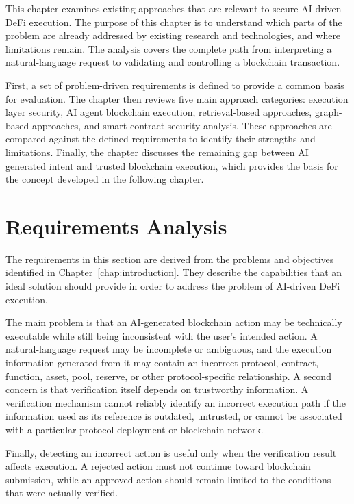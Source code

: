 This chapter examines existing approaches that are relevant to secure AI-driven DeFi execution. The purpose of this chapter is to understand which parts of the problem are already addressed by existing research and technologies, and where limitations remain. The analysis covers the complete path from interpreting a natural-language request to validating and controlling a blockchain transaction.

First, a set of problem-driven requirements is defined to provide a common basis for evaluation. The chapter then reviews five main approach categories: execution layer security, AI agent blockchain execution, retrieval-based approaches, graph-based approaches, and smart contract security analysis. These approaches are compared against the defined requirements to identify their strengths and limitations. Finally, the chapter discusses the remaining gap between AI generated intent and trusted blockchain execution, which provides the basis for the concept developed in the following chapter.


\section{Requirements Analysis}
\label{sec:requirements_analysis}

The requirements in this section are derived from the problems and objectives
identified in Chapter~\ref{chap:introduction}. They describe the capabilities
that an ideal solution should provide in order to address the problem of
AI-driven DeFi execution.

The main problem is that an AI-generated blockchain action may be technically
executable while still being inconsistent with the user's intended action.
A natural-language request may be incomplete or ambiguous, and the execution
information generated from it may contain an incorrect protocol, contract,
function, asset, pool, reserve, or other protocol-specific relationship. A second concern is that verification itself depends on trustworthy information.
A verification mechanism cannot reliably identify an incorrect execution path
if the information used as its reference is outdated, untrusted, or cannot be
associated with a particular protocol deployment or blockchain network.

Finally, detecting an incorrect action is useful only when the verification
result affects execution. A rejected action must not continue toward blockchain
submission, while an approved action should remain limited to the conditions
that were actually verified.

